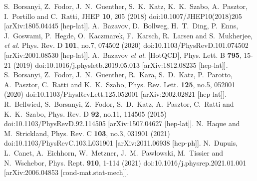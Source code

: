 \documentclass[a4paper,11pt]{article}
\begin{document}
\begin{thebibliography}{}
S.~Borsanyi, Z.~Fodor, J.~N.~Guenther, S.~K.~Katz, K.~K.~Szabo, A.~Pasztor, I.~Portillo and C.~Ratti,
JHEP \textbf{10}, 205 (2018)
doi:10.1007/JHEP10(2018)205
[arXiv:1805.04445 [hep-lat]].
A.~Bazavov, D.~Bollweg, H.~T.~Ding, P.~Enns, J.~Goswami, P.~Hegde, O.~Kaczmarek, F.~Karsch, R.~Larsen and S.~Mukherjee, \textit{et al.}
Phys. Rev. D \textbf{101}, no.7, 074502 (2020)
doi:10.1103/PhysRevD.101.074502
[arXiv:2001.08530 [hep-lat]].
A.~Bazavov \textit{et al.} [HotQCD],
Phys. Lett. B \textbf{795}, 15-21 (2019)
doi:10.1016/j.physletb.2019.05.013
[arXiv:1812.08235 [hep-lat]].
S.~Borsanyi, Z.~Fodor, J.~N.~Guenther, R.~Kara, S.~D.~Katz, P.~Parotto, A.~Pasztor, C.~Ratti and K.~K.~Szabo,
Phys. Rev. Lett. \textbf{125}, no.5, 052001 (2020)
doi:10.1103/PhysRevLett.125.052001
[arXiv:2002.02821 [hep-lat]].
R.~Bellwied, S.~Borsanyi, Z.~Fodor, S.~D.~Katz, A.~Pasztor, C.~Ratti and K.~K.~Szabo,
Phys. Rev. D \textbf{92}, no.11, 114505 (2015)
doi:10.1103/PhysRevD.92.114505
[arXiv:1507.04627 [hep-lat]].
N.~Haque and M.~Strickland,
Phys. Rev. C \textbf{103}, no.3, 031901 (2021)
doi:10.1103/PhysRevC.103.L031901
[arXiv:2011.06938 [hep-ph]].
N.~Dupuis, L.~Canet, A.~Eichhorn, W.~Metzner, J.~M.~Pawlowski, M.~Tissier and N.~Wschebor,
Phys. Rept. \textbf{910}, 1-114 (2021)
doi:10.1016/j.physrep.2021.01.001
[arXiv:2006.04853 [cond-mat.stat-mech]].


\end{thebibliography}
\end{document}
